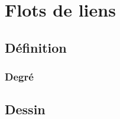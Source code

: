 \chapter{Flots de liens}
\section{Définition}
\label{sec:definition}
\subsection{Degré}
\section{Dessin}